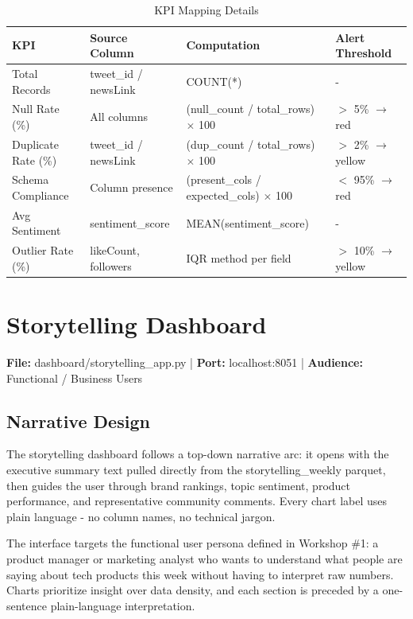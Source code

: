 \documentclass[12pt, a4paper]{article}
\begin{document}
\begin{table}[h]
\centering
\renewcommand{\arraystretch}{1.5} %
\begin{tabularx}{\textwidth}{>{\raggedright\arraybackslash}p{3.5cm} >{\raggedright\arraybackslash}p{3.5cm} >{\raggedright\arraybackslash}X >{\raggedright\arraybackslash}p{3.2cm}}
\toprule
\textbf{KPI} & \textbf{Source Column} & \textbf{Computation} & \textbf{Alert Threshold} \\
\midrule
Total Records & tweet\_id / newsLink & COUNT(*) & - \\
Null Rate (\%) & All columns & (null\_count / total\_rows) $\times$ 100 & $>$ 5\% $\rightarrow$ red \\
Duplicate Rate (\%) & tweet\_id / newsLink & (dup\_count / total\_rows) $\times$ 100 & $>$ 2\% $\rightarrow$ yellow \\
Schema Compliance & Column presence & (present\_cols / expected\_cols) $\times$ 100 & $<$ 95\% $\rightarrow$ red \\
Avg Sentiment & sentiment\_score & MEAN(sentiment\_score) & - \\
Outlier Rate (\%) & likeCount, followers & IQR method per field & $>$ 10\% $\rightarrow$ yellow \\
\bottomrule
\end{tabularx}
\caption{KPI Mapping Details}
\end{table}

\section{Storytelling Dashboard}
\textbf{File:} dashboard/storytelling\_app.py | \textbf{Port:} localhost:8051 | \textbf{Audience:} Functional / Business Users

\subsection{Narrative Design}
The storytelling dashboard follows a top-down narrative arc: it opens with the executive summary text pulled directly from the storytelling\_weekly parquet, then guides the user through brand rankings, topic sentiment, product performance, and representative community comments. Every chart label uses plain language - no column names, no technical jargon. 

The interface targets the functional user persona defined in Workshop \#1: a product manager or marketing analyst who wants to understand what people are saying about tech products this week without having to interpret raw numbers. Charts prioritize insight over data density, and each section is preceded by a one-sentence plain-language interpretation.
\end{document}
